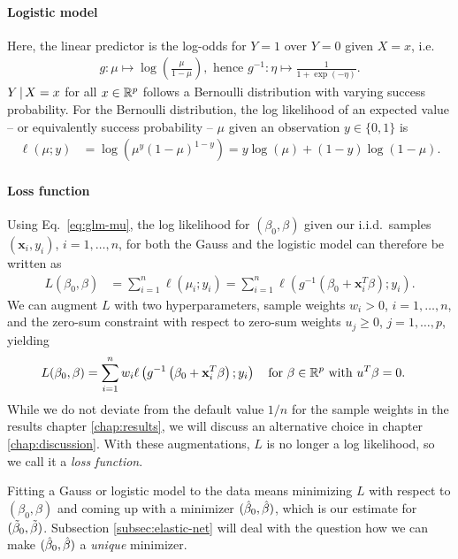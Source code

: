 \paragraph{Logistic model}
Here, the linear predictor is the log-odds for $Y = 1$ over $Y = 0$ given $X = x$, i.e.
\begin{align}
    g: \mu \mapsto \log\left( \frac{\mu}{1 - \mu} \right), \text{ hence } g^{-1}: \eta \mapsto
    \frac{1}{1 + \exp(-\eta)}.
\end{align}
$Y \,|\, X = x$ for all $x \in \mathbb{R}^p$ follows a Bernoulli distribution with varying success 
probability. For the Bernoulli distribution, the log likelihood of an expected value -- or 
equivalently success probability -- $\mu$ given an observation $y \in \{0, 1\}$ is
\begin{align}
    \ell(\mu; y) &= \log\left( \mu^{y} (1 - \mu)^{1 - y} \right) 
    = y \log(\mu) + (1 - y) \log(1 - \mu). 
\end{align}

\paragraph{Loss function}
Using Eq.\ \eqref{eq:glm-mu}, the log likelihood for $(\beta_0, \beta)$ given our i.i.d.\ samples 
$(\mathbf{x}_i, y_i)$, $i = 1, \ldots, n$, for both the Gauss and the logistic model can therefore 
be written as
\begin{align}
    L(\beta_0, \beta) &= \sum_{i=1}^n \ell(\mu_i; y_i) 
    = \sum_{i=1}^n \ell\left( g^{-1}\left( \beta_0 + \mathbf{x}_i^T \beta \right); y_i \right).
\end{align}
We can augment $L$ with two hyperparameters, sample weights $w_i > 0$, $i = 1, \ldots, n$, and the 
zero-sum constraint \cite{zerosum16} with respect to zero-sum weights 
$u_j \geq 0$, $j = 1, \ldots, p$, yielding 
\begin{align} \label{eq:loss-glm-no-lasso}
    L(\beta_0, \beta) &= \sum_{i=1}^n w_i \ell\left( g^{-1}\left( \beta_0 + \mathbf{x}_i^T \beta \right); 
    y_i \right) \quad \text{for } \beta \in \mathbb{R}^p \text{ with } u^T \beta = 0.
\end{align}
While we do not deviate from the default value $1/n$ for the sample weights in the results chapter 
\ref{chap:results}, we will discuss an alternative choice in chapter \ref{chap:discussion}. 
With these augmentations, $L$ is no longer a log likelihood, so we call it a \textit{loss function}.

Fitting a Gauss or logistic model to the data means minimizing $L$ with respect to 
$(\beta_0, \beta)$ and coming up with a minimizer $(\hat{\beta}_0, \hat{\beta})$, which is our estimate for 
$(\tilde{\beta}_0, \tilde{\beta})$. Subsection \ref{subsec:elastic-net} will deal with the question how we can 
make $(\hat{\beta}_0, \hat{\beta})$ a \textit{unique} minimizer.

